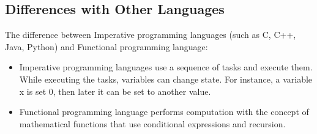 \documentclass{article}
\begin{document}
\subsection{Differences with Other Languages}

The difference between Imperative programming languages (such as C, C++, Java, Python) and Functional programming language:
\begin{itemize}
  \item Imperative programming languages use a sequence of tasks and execute them. While executing the tasks, variables can change state. For instance, a variable x is set 0, then later it can be set to another value. 
  \item Functional programming language performs computation with the concept of mathematical functions that use conditional expressions and recursion.
\end{itemize}
 
\end{document}
